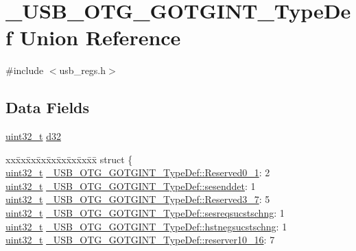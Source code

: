 \hypertarget{union___u_s_b___o_t_g___g_o_t_g_i_n_t___type_def}{\section{\-\_\-\-U\-S\-B\-\_\-\-O\-T\-G\-\_\-\-G\-O\-T\-G\-I\-N\-T\-\_\-\-Type\-Def Union Reference}
\label{union___u_s_b___o_t_g___g_o_t_g_i_n_t___type_def}
}


{\ttfamily \#include $<$usb\-\_\-regs.\-h$>$}

\subsection*{Data Fields}
\begin{DoxyCompactItemize}
\item 
\hyperlink{stdint_8h_a435d1572bf3f880d55459d9805097f62}{uint32\-\_\-t} \hyperlink{group___u_s_b___o_t_g___d_r_i_v_e_r_gaccd55daf5f4a8c68ad1a4d257c19538c}{d32}
\item 
\begin{tabbing}
xx\=xx\=xx\=xx\=xx\=xx\=xx\=xx\=xx\=\kill
struct \{\\
\>\hyperlink{stdint_8h_a435d1572bf3f880d55459d9805097f62}{uint32\_t} \hyperlink{group___u_s_b___o_t_g___d_r_i_v_e_r_gaa27cf9c3b6dabb69c2e2c1bf48655e7d}{\_USB\_OTG\_GOTGINT\_TypeDef::Reserved0\_1}: 2\\
\>\hyperlink{stdint_8h_a435d1572bf3f880d55459d9805097f62}{uint32\_t} \hyperlink{group___u_s_b___o_t_g___d_r_i_v_e_r_gac879190d50dfae7a98b21236d524b7da}{\_USB\_OTG\_GOTGINT\_TypeDef::sesenddet}: 1\\
\>\hyperlink{stdint_8h_a435d1572bf3f880d55459d9805097f62}{uint32\_t} \hyperlink{group___u_s_b___o_t_g___d_r_i_v_e_r_gad5f21fa6443d761dd45cf6056dbbadc3}{\_USB\_OTG\_GOTGINT\_TypeDef::Reserved3\_7}: 5\\
\>\hyperlink{stdint_8h_a435d1572bf3f880d55459d9805097f62}{uint32\_t} \hyperlink{group___u_s_b___o_t_g___d_r_i_v_e_r_gae1b7683211f53c2ae86a79983383a49f}{\_USB\_OTG\_GOTGINT\_TypeDef::sesreqsucstschng}: 1\\
\>\hyperlink{stdint_8h_a435d1572bf3f880d55459d9805097f62}{uint32\_t} \hyperlink{group___u_s_b___o_t_g___d_r_i_v_e_r_ga4910cdca8d45c257197d1eafda55ddbb}{\_USB\_OTG\_GOTGINT\_TypeDef::hstnegsucstschng}: 1\\
\>\hyperlink{stdint_8h_a435d1572bf3f880d55459d9805097f62}{uint32\_t} \hyperlink{group___u_s_b___o_t_g___d_r_i_v_e_r_gae428c081adf043cb149c9d1dd45c1a99}{\_USB\_OTG\_GOTGINT\_TypeDef::reserver10\_16}: 7\\

\end{tabbing}
\end{DoxyCompactItemize}
